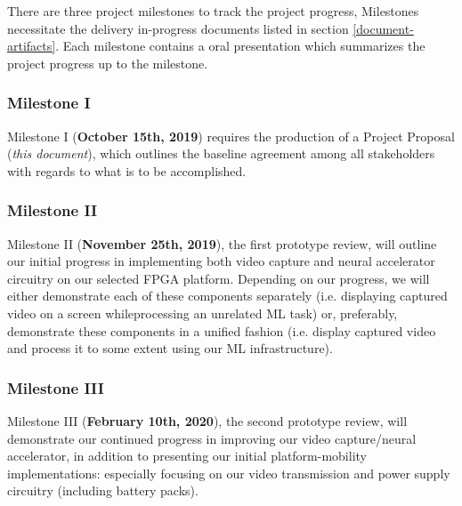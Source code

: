 There are three project milestones to track the project progress,
Milestones necessitate the delivery in-progress documents listed
in section \ref{document-artifacts}. Each milestone contains a oral
presentation which summarizes the project progress up to the milestone.

\subsubsection{Milestone I}
Milestone I (\textbf{October 15th, 2019}) requires the production of a
Project Proposal (\textit{this document}), which outlines the baseline
agreement among all stakeholders with regards to what is to be accomplished. 

\subsubsection{Milestone II}
Milestone II (\textbf{November 25th, 2019}), the first prototype review,
will outline our initial progress in implementing both video capture and
neural accelerator circuitry on our selected FPGA platform. Depending on
our progress, we will either demonstrate each of these components separately
(i.e. displaying captured video on a screen whileprocessing an unrelated
ML task) or, preferably, demonstrate these components in a unified fashion
(i.e. display captured video and process it to some extent using our ML
infrastructure). 

\subsubsection{Milestone III}
Milestone III (\textbf{February 10th, 2020}), the second prototype review,
will demonstrate our continued progress in improving our video capture/neural
accelerator, in addition to presenting our initial platform-mobility
implementations: especially focusing on our video transmission and power
supply circuitry (including battery packs). 